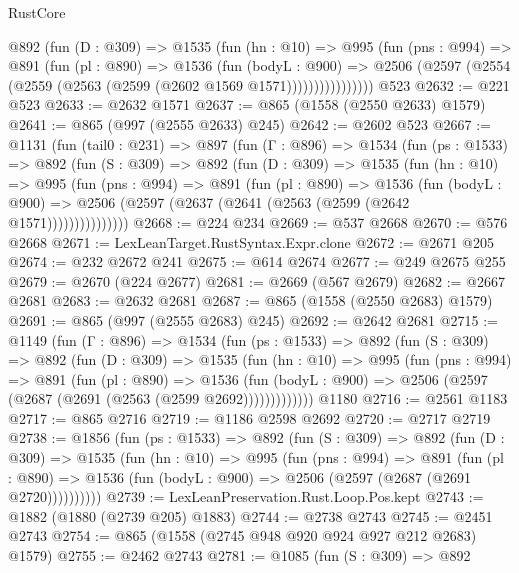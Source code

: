 \begin{lexlean}{RustCore}
\begin{coremodule}
            @892
              (fun (D : @309) =>
              @1535
                (fun (hn : @10) =>
                @995
                  (fun (pns : @994) =>
                  @891
                    (fun (pl : @890) =>
                    @1536
                      (fun (bodyL : @900) =>
                      @2506 (@2597 (@2554 (@2559 (@2563 (@2599 (@2602 @1569 @1571))))))))))))))))
    @523
@2632 := @221 @523
@2633 := @2632 @1571
@2637 := @865 (@1558 (@2550 @2633) @1579)
@2641 := @865 (@997 (@2555 @2633) @245)
@2642 := @2602 @523
@2667 := @1131
    (fun (tail0 : @231) =>
    @897
      (fun (Γ : @896) =>
      @1534
        (fun (ps : @1533) =>
        @892
          (fun (S : @309) =>
          @892
            (fun (D : @309) =>
            @1535
              (fun (hn : @10) =>
              @995
                (fun (pns : @994) =>
                @891
                  (fun (pl : @890) =>
                  @1536
                    (fun (bodyL : @900) =>
                    @2506 (@2597 (@2637 (@2641 (@2563 (@2599 (@2642 @1571)))))))))))))))
@2668 := @224 @234
@2669 := @537 @2668
@2670 := @576 @2668
@2671 := LexLeanTarget.RustSyntax.Expr.clone
@2672 := @2671 @205
@2674 := @232 @2672 @241
@2675 := @614 @2674
@2677 := @249 @2675 @255
@2679 := @2670 (@224 @2677)
@2681 := @2669 (@567 @2679)
@2682 := @2667 @2681
@2683 := @2632 @2681
@2687 := @865 (@1558 (@2550 @2683) @1579)
@2691 := @865 (@997 (@2555 @2683) @245)
@2692 := @2642 @2681
@2715 := @1149
    (fun (Γ : @896) =>
    @1534
      (fun (ps : @1533) =>
      @892
        (fun (S : @309) =>
        @892
          (fun (D : @309) =>
          @1535
            (fun (hn : @10) =>
            @995
              (fun (pns : @994) =>
              @891
                (fun (pl : @890) =>
                @1536
                  (fun (bodyL : @900) => @2506 (@2597 (@2687 (@2691 (@2563 (@2599 @2692)))))))))))))
    @1180
@2716 := @2561 @1183
@2717 := @865 @2716
@2719 := @1186 @2598 @2692
@2720 := @2717 @2719
@2738 := @1856
    (fun (ps : @1533) =>
    @892
      (fun (S : @309) =>
      @892
        (fun (D : @309) =>
        @1535
          (fun (hn : @10) =>
          @995
            (fun (pns : @994) =>
            @891
              (fun (pl : @890) =>
              @1536 (fun (bodyL : @900) => @2506 (@2597 (@2687 (@2691 @2720))))))))))
@2739 := LexLeanPreservation.Rust.Loop.Pos.kept
@2743 := @1882 (@1880 (@2739 @205) @1883)
@2744 := @2738 @2743
@2745 := @2451 @2743
@2754 := @865 (@1558 (@2745 @948 @920 @924 @927 @212 @2683) @1579)
@2755 := @2462 @2743
@2781 := @1085
    (fun (S : @309) =>
    @892

\end{coremodule}
\end{lexlean}
